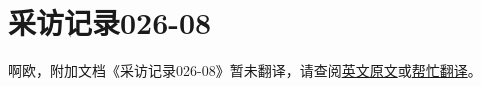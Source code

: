 \renewcommand{\DOCNAME}{采访记录026-08}
\renewcommand{\DOCSLUG}{interview-log-026-08}

\chapter{
    \DOCNAME
}

\label{chap:DOC-\DOCSLUG}

啊欧，附加文档《\DOCNAME 》暂未翻译，请查阅\href{http://scp-wiki.wikidot.com/\DOCSLUG}{英文原文}或\href{http://scp-wiki-cn.wikidot.com/\DOCSLUG}{帮忙翻译}。
